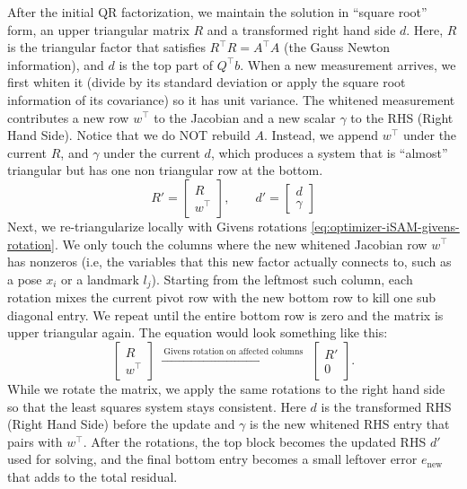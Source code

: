 
After the initial QR factorization, we maintain the solution in ``square root'' form, an upper triangular matrix $R$ and a transformed right hand side $d$. Here, $R$ is the triangular factor that satisfies $R^\top R = A^\top A$ (the Gauss Newton information), and $d$ is the top part of $Q^\top b$. When a new measurement arrives, we first whiten it (divide by its standard deviation or apply the square root information of its covariance) so it has unit variance. The whitened measurement contributes a new row $w^\top$ to the Jacobian and a new scalar $\gamma$ to the RHS (Right Hand Side). Notice that we do NOT rebuild $A$. Instead, we append $w^\top$ under the current $R$, and $\gamma$ under the current $d$, which produces a system that is ``almost'' triangular but has one non triangular row at the bottom.
$$
    R' = \begin{bmatrix} R\\ w^\top \end{bmatrix},\qquad
    d' = \begin{bmatrix} d\\ \gamma \end{bmatrix}
$$
Next, we re-triangularize locally with Givens rotations \eqref{eq:optimizer-iSAM-givens-rotation}. We only touch the columns where the new whitened Jacobian row $w^\top$ has nonzeros (i.e, the variables that this new factor actually connects to, such as a pose $x_i$ or a landmark $l_j$). Starting from the leftmost such column, each rotation mixes the current pivot row with the new bottom row to kill one sub diagonal entry. We repeat until the entire bottom row is zero and the matrix is upper triangular again. The equation would look something like this:
$$
    \begin{bmatrix} R\\ w^\top \end{bmatrix}
    \ \xrightarrow{\ \text{Givens rotation on affected columns}\ }\ 
    \begin{bmatrix} R'\\ 0 \end{bmatrix}.
$$
While we rotate the matrix, we apply the same rotations to the right hand side so that the least squares system stays consistent. Here $d$ is the transformed RHS (Right Hand Side) before the update and $\gamma$ is the new whitened RHS entry that pairs with $w^\top$. After the rotations, the top block becomes the updated RHS $d'$ used for solving, and the final bottom entry becomes a small leftover error $e_{\text{new}}$ that adds to the total residual. 
